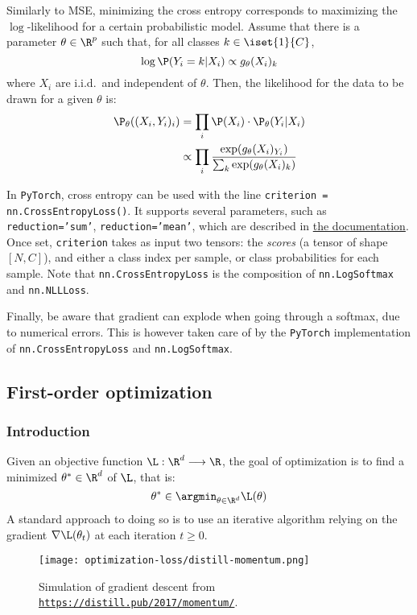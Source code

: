 Similarly to MSE, minimizing the cross entropy corresponds to maximizing the $\log$-likelihood for a certain probabilistic model. Assume that there is a parameter $\theta\in\R^p$ such that, for all classes $k\in\iset{1}{C}$,
\begin{equation*}
    \log\P(Y_i=k|X_i) \propto g_\theta(X_i)_k
\end{equation*}
where $X_i$ are i.i.d.~and independent of $\theta$. Then, the likelihood for the data to be drawn for a given $\theta$ is:
\begin{equation*}
    \begin{aligned}
        \P_\theta((X_i,Y_i)_i) &= \prod_i\P(X_i)\cdot\P_\theta(Y_i|X_i)\\
        &\propto\prod_i\frac{\exp(g_\theta(X_i)_{Y_i})}{\sum_k\exp(g_\theta(X_i)_k)}
    \end{aligned}
\end{equation*}

In \texttt{PyTorch}, cross entropy can be used with the line \texttt{criterion = nn.CrossEntropyLoss()}. It supports several parameters, such as \texttt{reduction='sum'}, \texttt{reduction='mean'}, which are described in \href{https://pytorch.org/docs/stable/generated/torch.nn.MSELoss.html}{the documentation}. Once set, \texttt{criterion} takes as input two tensors: the \emph{scores} (a tensor of shape $[N,C]$), and either a class index per sample, or class probabilities for each sample. Note that \texttt{nn.CrossEntropyLoss} is the composition of \texttt{nn.LogSoftmax} and \texttt{nn.NLLLoss}.

Finally, be aware that gradient can explode when going through a softmax, due to numerical errors. This is however taken care of by the \texttt{PyTorch} implementation of \texttt{nn.CrossEntropyLoss} and \texttt{nn.LogSoftmax}.

\subsection{First-order optimization}
\subsubsection{Introduction}
Given an objective function $\L:\R^d\longrightarrow\R$, the goal of optimization is to find a minimized $\theta^*\in\R^d$ of $\L$, that is:
\begin{equation*}
    \theta^*\in\argmin_{\theta\in\R^d}\L(\theta)
\end{equation*}
A standard approach to doing so is to use an iterative algorithm relying on the gradient $\nabla\L(\theta_t)$ at each iteration $t\geq0$.
\begin{figure}[H]
    \centering
    \texttt{[image: optimization-loss/distill-momentum.png]}
    \caption{Simulation of gradient descent from \href{https://distill.pub/2017/momentum/}{\nolinkurl{https://distill.pub/2017/momentum/}}.}
\end{figure}


